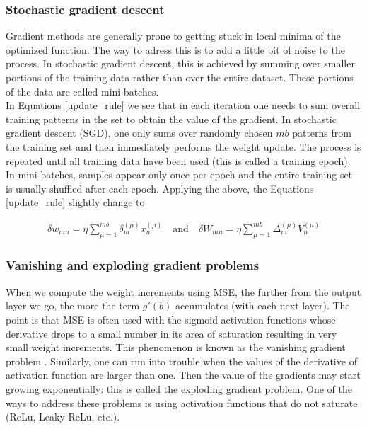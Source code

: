 \subsubsection{Stochastic gradient descent}

Gradient methods are generally prone to getting stuck in local minima of the optimized function. The way to adress this is to add a little bit of noise to the process. In stochastic gradient descent, this is achieved by summing over smaller portions of the training data rather than over the entire dataset. These portions of the data are called mini-batches. \cite{mehlig} \\

In Equations \ref{update_rule} we see that in each iteration one needs to sum overall training patterns in the set to obtain the value of the gradient. In stochastic gradient descent (SGD), one only sums over randomly chosen $ mb $ patterns from the training set and then immediately performs the weight update. The process is repeated until all training data have been used (this is called a training epoch). In mini-batches, samples appear only once per epoch and the entire training set is usually shuffled after each epoch. \cite{mehlig} Applying the above, the Equations \ref{update_rule} slightly change to \cite{mehlig}

\begin{gather}
\delta w_{mn} = \eta \sum\limits_{\mu=1}^{mb} \delta_{m}^{(\mu)} x_{n}^{(\mu)}
\quad \text{and} \quad 
\delta W_{mn} = \eta \sum\limits_{\mu=1}^{mb} \Delta_{m}^{(\mu)} V_{n}^{(\mu)}	
\end{gather}

\subsubsection{Vanishing and exploding gradient problems}

When we compute the weight increments using MSE, the further from the output layer we go, the more the term $ g'(b) $ accumulates (with each next layer). The point is that MSE is often used with the sigmoid activation functions whose derivative drops to a small number in its area of saturation resulting in very small weight increments. This phenomenon is known as the vanishing gradient problem \cite{mehlig}. Similarly, one can run into trouble when the values of the derivative of activation function are larger than one. Then the value of the gradients may start growing exponentially: this is called the exploding gradient problem. \cite{eniola} One of the ways to address these problems is using activation functions that do not saturate (ReLu, Leaky ReLu, etc.). \cite{mehlig} \cite{stanford-L4}

